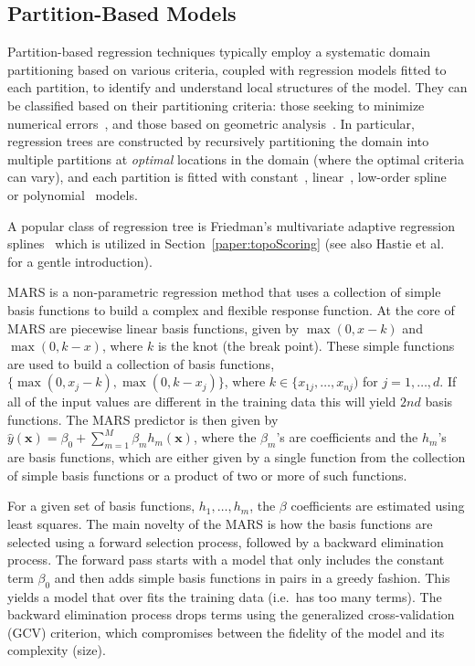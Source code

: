 \subsection{Partition-Based Models}
Partition-based regression techniques typically employ a systematic domain partitioning based on various criteria, coupled with regression models fitted to each partition, to identify and understand local structures of the model.
%
They can be classified based on their partitioning criteria: those seeking to minimize numerical errors~\cite{Friedman1991,AlexanderGrimshaw1996,BreimanFriedmanOlshen1984a,ChaudhuriHuangLoh1994,ChipmanMcCulloch2010}, and those based on geometric analysis~\cite{GerberPotter2012,GerberRubelBremer2011,LiLueChen2000}.
%
In particular, regression trees are constructed by recursively partitioning the domain into multiple partitions at \emph{optimal} locations in the domain (where the optimal criteria can vary), and each partition is fitted with constant~\cite{BreimanFriedmanOlshen1984a}, linear~\cite{AlexanderGrimshaw1996,LiLueChen2000}, low-order spline~\cite{Friedman1991} or polynomial~\cite{ChaudhuriHuangLoh1994} models.

A popular class of regression tree is Friedman's multivariate adaptive regression splines~\cite{Friedman1991} which is utilized in Section~\ref{paper:topoScoring} (see also Hastie et al.~\cite{HastieTibshiraniFriedman2008} for a gentle introduction).

MARS is a non-parametric regression method that uses a collection of simple basis functions to build a complex and flexible response function.
%
At the core of MARS are piecewise linear basis functions, given by $\max(0, x - k)$ and $\max(0, k - x)$, where $k$ is the knot (the break point).
%
These simple functions are used to build a collection of basis functions, $\{\max(0, x_j-k), \max(0,k-x_j)\}$, where $k \in \{x_{1j}, \dots, x_{nj})$ for $j = 1, \dots, d$.
%
If all of the input values are different in the training data this will yield $2nd$ basis functions. The MARS predictor is then given by $\hat{y}(\mathbf{x}) = \beta_0 + \sum_{m=1}^M \beta_m h_m(\mathbf{x})$, where the $\beta_m$'s are coefficients and the $h_m$'s are basis functions, which are either given by a single function from the collection of simple basis functions or a product of
two or more of such functions.

For a given set of basis functions, $h_1, \dots, h_m$, the $\beta$ coefficients are estimated using least squares.
%
The main novelty of the MARS is how the basis functions are selected using a forward selection process, followed by a backward elimination process.
%
The forward pass starts with a model that only includes the constant term $\beta_0$ and then adds simple basis functions in pairs in a greedy fashion.
%
This yields a model that over fits the training data (i.e.\ has too many terms).
%
The backward elimination process drops terms using the generalized cross-validation (GCV) criterion, which compromises between the fidelity of the model and its complexity (size).

